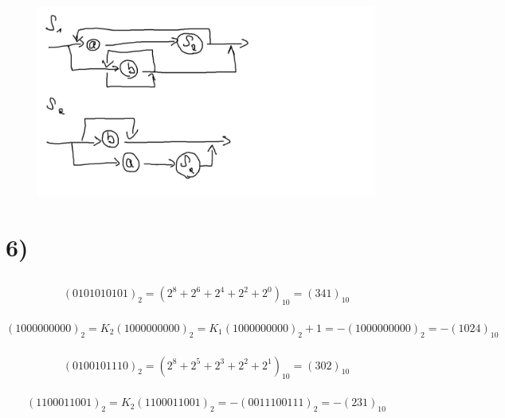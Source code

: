 \documentclass[12pt]{article}
\begin{document}
\subsection{}
\begin{figure}[h]
    \centering
    \includegraphics[width = 1\textwidth]{progradiagramm.png}
    \caption{}
    \label{}
\end{figure}

\pagebreak %

\section{6)}

\subsection{}
\subsubsection{}
$$ (0101010101)_2 = (2^8+2^6+2^4+2^2+2^0)_{10} = (341)_{10} $$
\subsubsection{}
$$ (1000000000)_2 = K_2(1000000000)_2 = K_1(1000000000)_2 + 1 = -(1000000000)_2 = -(1024)_{10} $$
\subsubsection{}
$$ (0100101110)_2 = (2^8 + 2^5 + 2^3+2^2+2^1)_{10} = (302)_{10}$$
\subsubsection{}
$$ (1100011001)_2 = K_2(1100011001)_2 = -(0011100111)_2 = -(231)_{10} $$
\end{document}
